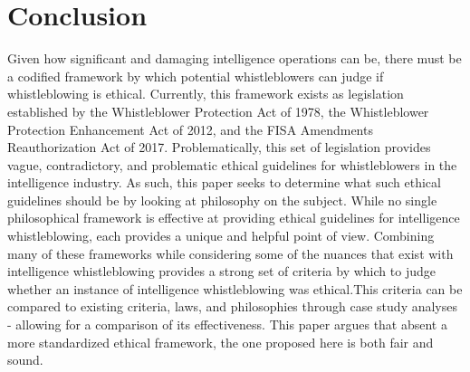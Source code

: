 \documentclass [12 pt] {article}
\begin{document}
\section {Conclusion}
Given how significant and damaging intelligence operations can be, there must be a codified framework by which potential whistleblowers can judge if whistleblowing is ethical. Currently, this framework exists as legislation established by the Whistleblower Protection Act of 1978, the Whistleblower Protection Enhancement Act of 2012, and the FISA Amendments Reauthorization Act of 2017. Problematically, this set of legislation provides vague, contradictory, and problematic ethical guidelines for whistleblowers in the intelligence industry. As such, this paper seeks to determine what such ethical guidelines should be by looking at philosophy on the subject.
\bigbreak
While no single philosophical framework is effective at providing ethical guidelines for intelligence whistleblowing, each provides a unique and helpful point of view. Combining many of these frameworks while considering some of the nuances that exist with intelligence whistleblowing provides a strong set of criteria by which to judge whether an instance of intelligence whistleblowing was ethical.This criteria can be compared to existing criteria, laws, and philosophies through case study analyses - allowing for a comparison of its effectiveness. This paper argues that absent a more standardized ethical framework, the one proposed here is both fair and sound.
\end{document}
